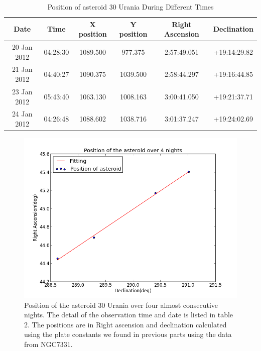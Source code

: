 \documentclass[letterpaper,12pt]{article}
\begin{document}
        
\FloatBarrier
\begin{table}[h!]
\caption{Position of asteroid 30 Urania During Different Times} %
\centering %
\begin{tabular}{c c c c c c } %
\hline\hline %
Date & Time & X position & Y position & Right Ascension & Declination\\ [0.5ex] %
\hline %
20 Jan 2012 & 04:28:30  & 1089.500 & 977.375 &  2:57:49.051 & +19:14:29.82\\ %
21 Jan 2012 & 04:40:27  & 1090.375 & 1039.500 & 2:58:44.297 & +19:16:44.85\\
23 Jan 2012 & 05:43:40  & 1063.130 & 1008.163  & 3:00:41.050  & +19:21:37.71\\
24 Jan 2012 & 04:26:48  & 1088.602 & 1038.716 & 3:01:37.247 & +19:24:02.69\\ [1ex] %
\hline %
\end{tabular}
\label{table:nonlin} %
\end{table}
\FloatBarrier




\FloatBarrier
\begin{figure}[h!]
\centering
\includegraphics[scale=0.5]{position_asteroid.png}
\caption{Position of the asteroid 30 Urania over four almost consecutive nights. The detail of the observation time and date is listed in table 2. The positions are in Right ascension and declination calculated using the plate constants we found in previous parts using the data from NGC7331.}
\end{figure}
\FloatBarrier
\end{document}
